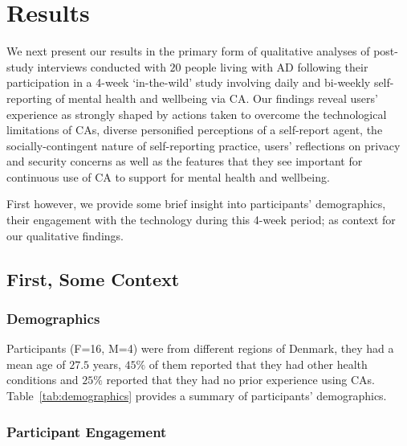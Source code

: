 \section{Results}

    We next present our results in the primary form of qualitative analyses of post-study interviews conducted with $20$ 
    people living with \ac{AD} following their participation in a 4-week `in-the-wild' study involving daily and bi-weekly self-reporting of mental health and wellbeing via \ac{CA}. Our findings reveal users' experience as strongly shaped by    
        actions taken to overcome the technological limitations of \acp{CA}, 
        diverse personified perceptions of a self-report agent, 
        the socially-contingent nature of self-reporting practice, 
        users' reflections on privacy and security concerns as well as the features that they see important for continuous use of \ac{CA} to support for mental health and wellbeing.

    First however, we provide some brief insight into participants' demographics, their engagement with the technology during this 4-week period; as context for our qualitative findings.
    
    \subsection{First, Some Context}  
        
        \subsubsection{Demographics}
            
            Participants (F=16, M=4) were from different regions of Denmark, they had a mean age of $27.5$ years, $45\%$ of them reported that they had other health conditions and $25\%$ reported that they had no prior experience using \acp{CA}. Table~\ref{tab:demographics} provides a summary of participants' demographics. 
            
    
        \subsubsection{Participant Engagement}\label{sec:perceived_engagement}
        
